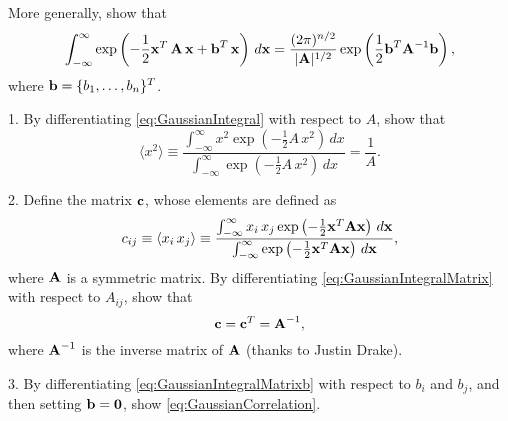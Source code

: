 \documentclass[12pt]{book}
\begin{document}



More generally, show that
\begin{equation}
  \int_{-\infty}^{\infty}
  \exp\left(
    -\frac{1}{2} \boldsymbol{\mathbf{x}}^T \, \boldsymbol{\mathbf{A}} \, \boldsymbol{\mathbf{x}}
    + \boldsymbol{\mathbf{b}}^T \, \boldsymbol{\mathbf{x}}
  \right) \, d\boldsymbol{\mathbf{x}}
  =
  \frac{ (2\pi)^{n/2} }
  { |\boldsymbol{\mathbf{A}}|^{1/2} }
  \exp\left( \frac{1}{2} \boldsymbol{\mathbf{b}}^T \boldsymbol{\mathbf{A}}^{-1} \boldsymbol{\mathbf{b}} \right),
  \label{eq:GaussianIntegralMatrixb}
\end{equation}
%
where $\boldsymbol{\mathbf{b}} = \{b_1, \dots, b_n\}^T$.
%






1. By differentiating \eqref{eq:GaussianIntegral} with respect to $A$, show that
\begin{equation}
  \langle x^2 \rangle
\equiv \frac {
  \int_{-\infty}^{\infty}
    x^2 \exp\left( - \frac{1}{2} A\,x^2 \right) \, dx
} {
  \int_{-\infty}^{\infty}
  \exp\left( - \frac{1}{2} A\,x^2 \right) \, dx
}
=
\frac{1}{A}.
\end{equation}

2.
Define the matrix $\boldsymbol{\mathbf{c}}$, whose elements are defined as
\begin{equation*}
c_{ij}
\equiv \langle x_i \, x_j \rangle
\equiv \frac {
  \int_{-\infty}^{\infty}
    x_i \, x_j \exp\left( -\frac{1}{2} \boldsymbol{\mathbf{x}}^T \boldsymbol{\mathbf{A}} \boldsymbol{\mathbf{x}} \right) \, d\boldsymbol{\mathbf{x}}
} {
\int_{-\infty}^{\infty}
  \exp\left( -\frac{1}{2} \boldsymbol{\mathbf{x}}^T \boldsymbol{\mathbf{A}} \boldsymbol{\mathbf{x}} \right) \, d\boldsymbol{\mathbf{x}}
},
\end{equation*}
%
where $\boldsymbol{\mathbf{A}}$ is a symmetric matrix.
%
By differentiating \eqref{eq:GaussianIntegralMatrix} with respect to $A_{ij}$, show that
%
\begin{equation}
  \boldsymbol{\mathbf{c}} = \boldsymbol{\mathbf{c}}^T = \boldsymbol{\mathbf{A}}^{-1},
  \label{eq:GaussianCorrelation}
\end{equation}
%
where
$\boldsymbol{\mathbf{A}}^{-1}$ is the inverse matrix of $\boldsymbol{\mathbf{A}}$
(thanks to Justin Drake).


3. By differentiating \eqref{eq:GaussianIntegralMatrixb} with respect to $b_i$ and $b_j$,
and then setting $\boldsymbol{\mathbf{b}} = \boldsymbol{\mathbf{0}}$, show \eqref{eq:GaussianCorrelation}.
\end{document}
